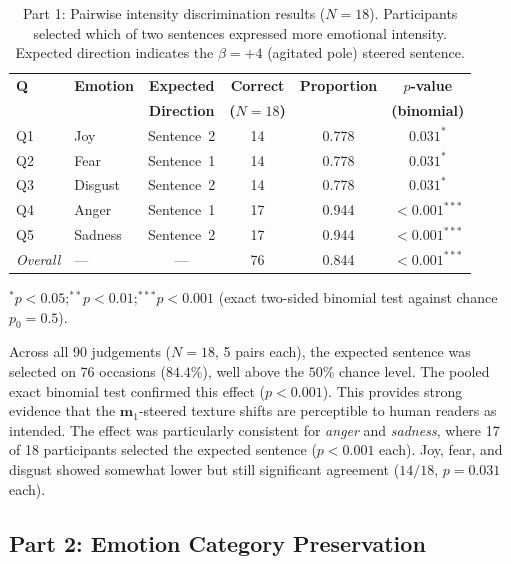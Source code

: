 \begin{table}[H]
\centering
\small
\begin{threeparttable}
\begin{tabular}{llcccc}
\toprule
\textbf{Q} & \textbf{Emotion} & \textbf{Expected} & \textbf{Correct} & \textbf{Proportion} & \textbf{$p$-value} \\
 & & \textbf{Direction} & \textbf{($N=18$)} & & \textbf{(binomial)} \\
\midrule
Q1 & Joy     & Sentence~2 & 14 & 0.778 & $0.031^{*}$ \\
Q2 & Fear    & Sentence~1 & 14 & 0.778 & $0.031^{*}$ \\
Q3 & Disgust & Sentence~2 & 14 & 0.778 & $0.031^{*}$ \\
Q4 & Anger   & Sentence~1 & 17 & 0.944 & $<0.001^{***}$ \\
Q5 & Sadness & Sentence~2 & 17 & 0.944 & $<0.001^{***}$ \\
\midrule
\textit{Overall} & --- & --- & 76 & 0.844 & $<0.001^{***}$ \\
\bottomrule
\end{tabular}
\begin{tablenotes}
\small
\item $^{*}p < 0.05$;\quad $^{**}p < 0.01$;\quad $^{***}p < 0.001$ (exact two-sided binomial test against chance $p_0 = 0.5$).
\end{tablenotes}
\end{threeparttable}
\caption{Part 1: Pairwise intensity discrimination results ($N = 18$). Participants selected which of two sentences expressed more emotional intensity. Expected direction indicates the $\beta=+4$ (agitated pole) steered sentence.}
\label{tab:human_eval_p1}
\end{table}

Across all 90 judgements ($N=18$, 5 pairs each), the expected sentence was selected on 76 occasions ($84.4\%$), well above the $50\%$ chance level. The pooled exact binomial test confirmed this effect ($p < 0.001$). This provides strong evidence that the $\mathbf{m}_1$-steered texture shifts are perceptible to human readers as intended. The effect was particularly consistent for \textit{anger} and \textit{sadness}, where 17 of 18 participants selected the expected sentence ($p < 0.001$ each). Joy, fear, and disgust showed somewhat lower but still significant agreement ($14/18$, $p = 0.031$ each).\par

\subsection{Part 2: Emotion Category Preservation}

